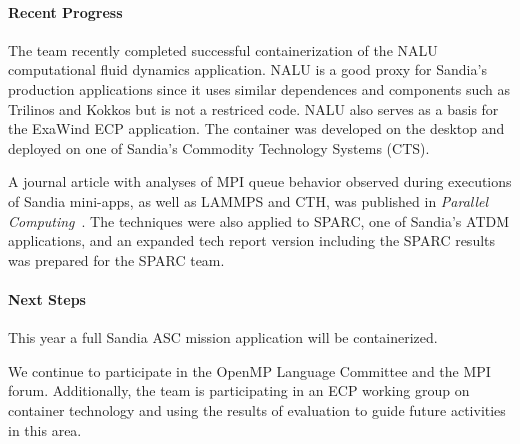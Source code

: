 \paragraph{Recent Progress}

The team recently completed successful containerization of the NALU 
computational fluid dynamics application.  NALU is a good proxy for 
Sandia's production applications since it uses similar dependences 
and components such as Trilinos and Kokkos but is not a restriced code.
NALU also serves as a basis for the ExaWind ECP application.
The container was developed on the desktop and deployed on one of 
Sandia's Commodity Technology Systems (CTS).

A journal article with analyses of MPI queue behavior observed during
executions of Sandia mini-apps, as well as LAMMPS and CTH, was 
published in {\it Parallel Computing}~\cite{Ferreira:Characterizing:2018}.
The techniques were also applied to SPARC, one of Sandia's ATDM
applications, and an expanded tech report version including the SPARC 
results was prepared for the SPARC team.

\paragraph{Next Steps}

This year a full Sandia ASC mission application will be containerized.

We continue to participate in the OpenMP Language Committee and the 
MPI forum.  Additionally, the team is participating in an ECP working 
group on container technology and using the results of evaluation to 
guide future activities in this area.


